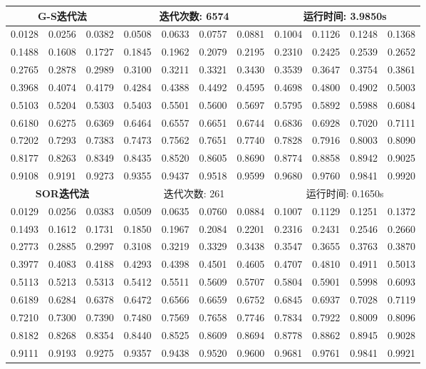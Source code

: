 \documentclass{article}
\begin{document}
\begin{table}[H]
\begin{tabular}{|*{11}{c}|}
		\multicolumn{3}{|c}{\textbf{G-S迭代法}} & \multicolumn{4}{|c}{迭代次数: 6574}\ & \multicolumn{4}{|c|}{运行时间: 3.9850s}\\
		\hline
		0.0128 & 0.0256 & 0.0382 & 0.0508 & 0.0633 & 0.0757 & 0.0881 & 0.1004 & 0.1126 & 0.1248 & 0.1368 \\
		0.1488 & 0.1608 & 0.1727 & 0.1845 & 0.1962 & 0.2079 & 0.2195 & 0.2310 & 0.2425 & 0.2539 & 0.2652 \\
		0.2765 & 0.2878 & 0.2989 & 0.3100 & 0.3211 & 0.3321 & 0.3430 & 0.3539 & 0.3647 & 0.3754 & 0.3861 \\
		0.3968 & 0.4074 & 0.4179 & 0.4284 & 0.4388 & 0.4492 & 0.4595 & 0.4698 & 0.4800 & 0.4902 & 0.5003 \\
		0.5103 & 0.5204 & 0.5303 & 0.5403 & 0.5501 & 0.5600 & 0.5697 & 0.5795 & 0.5892 & 0.5988 & 0.6084 \\
		0.6180 & 0.6275 & 0.6369 & 0.6464 & 0.6557 & 0.6651 & 0.6744 & 0.6836 & 0.6928 & 0.7020 & 0.7111 \\
		0.7202 & 0.7293 & 0.7383 & 0.7473 & 0.7562 & 0.7651 & 0.7740 & 0.7828 & 0.7916 & 0.8003 & 0.8090 \\
		0.8177 & 0.8263 & 0.8349 & 0.8435 & 0.8520 & 0.8605 & 0.8690 & 0.8774 & 0.8858 & 0.8942 & 0.9025 \\
		0.9108 & 0.9191 & 0.9273 & 0.9355 & 0.9437 & 0.9518 & 0.9599 & 0.9680 & 0.9760 & 0.9841 & 0.9920 \\
		\hline
		\multicolumn{3}{|c}{\textbf{SOR迭代法}} & \multicolumn{4}{|c}{迭代次数: 261}\ & \multicolumn{4}{|c|}{运行时间: 0.1650s}\\
		\hline
		0.0129 & 0.0256 & 0.0383 & 0.0509 & 0.0635 & 0.0760 & 0.0884 & 0.1007 & 0.1129 & 0.1251 & 0.1372 \\
		0.1493 & 0.1612 & 0.1731 & 0.1850 & 0.1967 & 0.2084 & 0.2201 & 0.2316 & 0.2431 & 0.2546 & 0.2660 \\
		0.2773 & 0.2885 & 0.2997 & 0.3108 & 0.3219 & 0.3329 & 0.3438 & 0.3547 & 0.3655 & 0.3763 & 0.3870 \\
		0.3977 & 0.4083 & 0.4188 & 0.4293 & 0.4398 & 0.4501 & 0.4605 & 0.4707 & 0.4810 & 0.4911 & 0.5013 \\
		0.5113 & 0.5213 & 0.5313 & 0.5412 & 0.5511 & 0.5609 & 0.5707 & 0.5804 & 0.5901 & 0.5998 & 0.6093 \\
		0.6189 & 0.6284 & 0.6378 & 0.6472 & 0.6566 & 0.6659 & 0.6752 & 0.6845 & 0.6937 & 0.7028 & 0.7119 \\
		0.7210 & 0.7300 & 0.7390 & 0.7480 & 0.7569 & 0.7658 & 0.7746 & 0.7834 & 0.7922 & 0.8009 & 0.8096 \\
		0.8182 & 0.8268 & 0.8354 & 0.8440 & 0.8525 & 0.8609 & 0.8694 & 0.8778 & 0.8862 & 0.8945 & 0.9028 \\
		0.9111 & 0.9193 & 0.9275 & 0.9357 & 0.9438 & 0.9520 & 0.9600 & 0.9681 & 0.9761 & 0.9841 & 0.9921 \\
		\hline
	\end{tabular}
\end{table}
\end{document}
